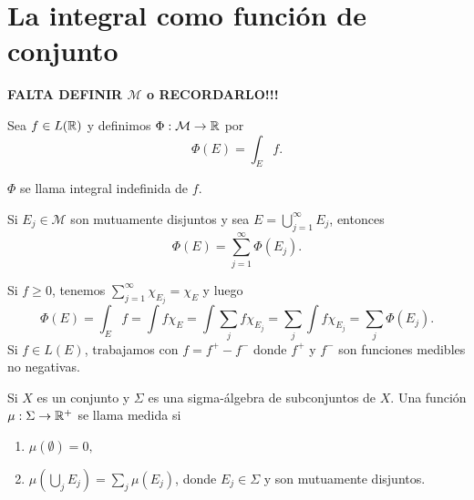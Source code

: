                     \section{La integral como funci\'on de conjunto}
                    
                    \textbf{FALTA DEFINIR $\mathcal{M}$ o RECORDARLO!!!} 
                    
                    Sea $f\in L(\mathbb{R})$ y definimos $\Phi: \mathcal{M} \to \mathbb{R}$
                    por
                    \[
                    \Phi(E)=\int_E f.
                    \]
                    
                    $\Phi$ se llama integral indefinida de $f$.
                    
                    \begin{teorema}{}
                    Si $E_j \in \mathcal{M}$ son mutuamente disjuntos y sea
                    $E=\bigcup\limits_{j=1}^{\infty}E_j$, entonces
                    \[\Phi(E)=\sum\limits_{j=1}^{\infty} \Phi(E_j).\]
                    \end{teorema}
                    
                    \begin{demo}
                    Si $f\geq 0$, tenemos 
                    $\sum\limits_{j=1}^{\infty} \chi_{E_j}=\chi_E$ y luego
                    \[
                    \Phi(E)=\int_E f = \int f \chi_E =\int \sum\limits_j f \chi_{E_j}=\sum\limits_{j} \int f \chi_{E_j}=\sum\limits_j \Phi(E_j).
                    \]
                    Si $f \in L(E)$, trabajamos con  $f=f^{+}-f^{-}$ donde 
                    $f^+$ y $f^-$ son funciones medibles no negativas.
                    \end{demo}
                    
                    \begin{definicion}{}
                    Si $X$ es un conjunto y $\Sigma$ es una sigma-\'algebra de subconjuntos de $X$. 
                    Una funci\'on $\mu:\Sigma \to \mathbb{R}^+$ se llama medida si
                    \begin{enumerate}
                        \item $\mu(\emptyset)=0,$
                        \item $\mu(\bigcup\limits_j E_j) = \sum\limits_j \mu(E_j)$, donde $E_j \in \Sigma$ y son mutuamente disjuntos.
                    \end{enumerate}
                    \end{definicion}
                    
